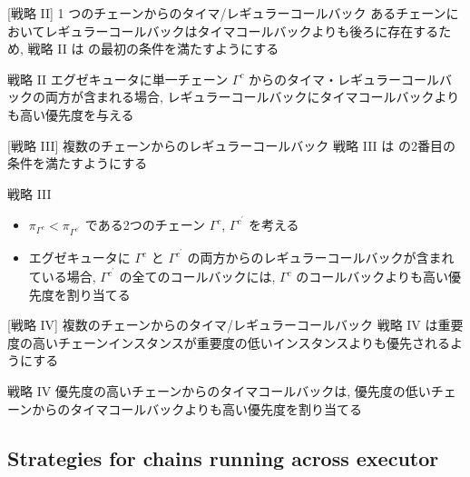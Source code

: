 \begin{frame}[label=strategy2]{[戦略 II] 1 つのチェーンからのタイマ/レギュラーコールバック}
    あるチェーンにおいてレギュラーコールバックはタイマコールバックよりも後ろに存在するため, 戦略 II は  の最初の条件を満たすようにする
    \begin{block}{戦略 II}
        エグゼキュータに単一チェーン $\Gamma^{c}$ からのタイマ・レギュラーコールバックの両方が含まれる場合, レギュラーコールバックにタイマコールバックよりも高い優先度を与える
    \end{block}
\end{frame}

\begin{frame}[label=strategy3]{[戦略 III] 複数のチェーンからのレギュラーコールバック}
    戦略 III は  の2番目の条件を満たすようにする
    \begin{block}{戦略 III}
        \setlength{\linewidth}{0.98\columnwidth}
        \begin{itemize}
            \item $\pi_{\Gamma^{c}}<\pi_{\Gamma^{c^{\prime}}}$ である2つのチェーン $\Gamma^{c}$, $\Gamma^{c^{\prime}}$ を考える
            \item エグゼキュータに $\Gamma^{c}$ と $\Gamma^{c^{\prime}}$ の両方からのレギュラーコールバックが含まれている場合, $\Gamma^{c^{\prime}}$ の全てのコールバックには, $\Gamma^{c}$ のコールバックよりも高い優先度を割り当てる
        \end{itemize}
    \end{block}
\end{frame}

\begin{frame}[label=strategy4]{[戦略 IV] 複数のチェーンからのタイマ/レギュラーコールバック}
    戦略 IV は重要度の高いチェーンインスタンスが重要度の低いインスタンスよりも優先されるようにする
    \begin{block}{戦略 IV}
        優先度の高いチェーンからのタイマコールバックは, 優先度の低いチェーンからのタイマコールバックよりも高い優先度を割り当てる
    \end{block}
\end{frame}


\subsection{Strategies for chains running across executor}
\label{ssec: strategies for chains running across executor}

